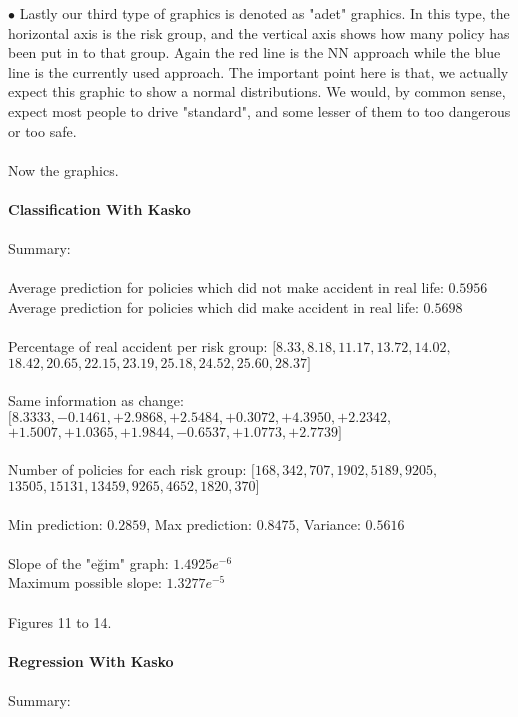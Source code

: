 \documentclass[titlepage, a4paper, 14pt]{extarticle} %
\begin{document}
$\bullet$ Lastly our third type of graphics is denoted as "adet" graphics. In this type, the horizontal axis is the risk group, and the vertical axis shows how many policy has been put in to that group. Again the red line is the NN approach while the blue line is the currently used approach. The important point here is that, we actually expect this graphic to show a normal distributions. We would, by common sense, expect most people to drive "standard", and some lesser of them to too dangerous or too safe.\\\\
Now the graphics. \\\\
\textbf{Classification With Kasko}\\\\
Summary: \\\\
Average prediction for policies which did not make accident in real life: $0.5956$ \\
Average prediction for policies which did make accident in real life: $0.5698$ \\\\
Percentage of real accident per risk group: $[8.33, 8.18, 11.17, 13.72, 14.02,$\\$ 18.42, 20.65, 22.15, 23.19, 25.18, 24.52, 25.60, 28.37]$ \\\\
Same information as change: $[8.3333, -0.1461, +2.9868, +2.5484, +0.3072, +4.3950, +2.2342,$\\$ +1.5007, +1.0365, +1.9844, -0.6537, +1.0773, +2.7739]$ \\\\
Number of policies for each risk group: $[168, 342, 707, 1902, 5189, 9205,$\\$ 13505, 15131, 13459, 9265, 4652, 1820, 370]$ \\\\
Min prediction: $0.2859$, Max prediction: $0.8475$, Variance: $0.5616$ \\\\
Slope of the "eğim" graph: $1.4925 e^{-6}$ \\
Maximum possible slope:  $1.3277 e^{-5}$ \\\\
Figures 11 to 14.\\\\
\textbf{Regression With Kasko}\\\\
Summary: \\\\
\end{document}
